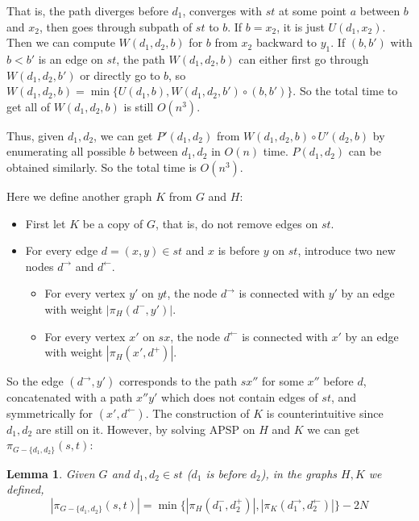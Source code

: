 \documentclass[11pt]{article}
\theoremstyle{plain}
\newtheorem{lemma}[theorem]{Lemma}
\theoremstyle{definition}
\newcommand{\set}[1]{\{ #1 \}}
\newcommand{\og}[3]{\pi_{G-#3}\left(#1,#2\right)}
\begin{document}
That is, the path diverges before $d_1$, converges with $st$ at some point $a$ between $b$ and $x_2$, then goes through subpath of $st$ to $b$. If $b=x_2$, it is just $U(d_1,x_2)$. Then we can compute $W(d_1,d_2,b)$ for $b$ from $x_2$ backward to $y_1$. If $(b,b')$ with $b<b'$ is an edge on $st$, the path $W(d_1,d_2,b)$ can either first go through $W(d_1,d_2,b')$ or directly go to $b$, so $W(d_1,d_2,b)=\min\{U(d_1,b), W(d_1,d_2,b')\circ (b,b')\}$. So the total time to get all of $W(d_1,d_2,b)$ is still $O(n^3)$.

Thus, given $d_1,d_2$, we can get $P'(d_1,d_2)$ from $W(d_1,d_2,b)\circ U'(d_2,b)$ by enumerating all possible $b$ between $d_1,d_2$ in $O(n)$ time. $P(d_1,d_2)$ can be obtained similarly. So the total time is $O(n^3)$.

\iffalse
Here we define another graph $K$ from $G$ and $H$:
\begin{itemize}
    \item First let $K$ be a copy of $G$, that is, do not remove edges on $st$.
    \item For every edge $d=(x,y)\in st$ and $x$ is before $y$ on $st$, introduce two new nodes $d^\rightarrow$ and $d^\leftarrow$. 
    \begin{itemize}
        \item For every vertex $y'$ on $yt$, the node $d^\rightarrow$ is connected with $y'$ by an edge with weight $|\pi_H(d^-,y')|$.
        \item For every vertex $x'$ on $sx$, the node $d^\leftarrow$ is connected with $x'$ by an edge with weight $|\pi_H(x',d^+)|$.
    \end{itemize}
\end{itemize}

So the edge $(d^\rightarrow,y')$ corresponds to the path $sx''$ for some $x''$ before $d$, concatenated with a path $x''y'$ which does not contain edges of $st$, and symmetrically for $(x',d^\leftarrow)$. The construction of $K$ is counterintuitive since $d_1,d_2$ are still on it. However, by solving APSP on $H$ and $K$ we can get $\og{s}{t}{\set{d_1, d_2}}$:

\begin{lemma} \label{lemma:2-2}
    Given $G$ and $d_1,d_2\in st$ ($d_1$ is before $d_2$), in the graphs $H,K$ we defined,
    $$|\og{s}{t}{\set{d_1, d_2}}|=\min\{|\pi_H(d_1^-,d_2^+)|, |\pi_K(d_1^\rightarrow, d_2^\leftarrow)|\}-2N$$
\end{lemma}
\end{document}
